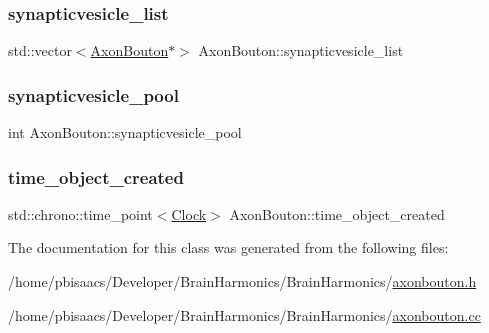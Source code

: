 \subsubsection{\texorpdfstring{synapticvesicle\+\_\+list}{synapticvesicle\_list}}
{\footnotesize\ttfamily std\+::vector$<$\mbox{\hyperlink{classAxonBouton}{Axon\+Bouton}}$\ast$$>$ Axon\+Bouton\+::synapticvesicle\+\_\+list\hspace{0.3cm}{\ttfamily [protected]}}

\mbox{\label{classAxonBouton_a6af09fee2eb7a38e8591770bc9c070ac}} 
\subsubsection{\texorpdfstring{synapticvesicle\+\_\+pool}{synapticvesicle\_pool}}
{\footnotesize\ttfamily int Axon\+Bouton\+::synapticvesicle\+\_\+pool\hspace{0.3cm}{\ttfamily [private]}}

\mbox{\label{classAxonBouton_a26b17307437394ff14bfb5ef8dfad1e5}} 
\subsubsection{\texorpdfstring{time\+\_\+object\+\_\+created}{time\_object\_created}}
{\footnotesize\ttfamily std\+::chrono\+::time\+\_\+point$<$\mbox{\hyperlink{universe_8h_a0ef8d951d1ca5ab3cfaf7ab4c7a6fd80}{Clock}}$>$ Axon\+Bouton\+::time\+\_\+object\+\_\+created\hspace{0.3cm}{\ttfamily [private]}}



The documentation for this class was generated from the following files\+:\begin{DoxyCompactItemize}
\item 
/home/pbisaacs/\+Developer/\+Brain\+Harmonics/\+Brain\+Harmonics/\mbox{\hyperlink{axonbouton_8h}{axonbouton.\+h}}\item 
/home/pbisaacs/\+Developer/\+Brain\+Harmonics/\+Brain\+Harmonics/\mbox{\hyperlink{axonbouton_8cc}{axonbouton.\+cc}}\end{DoxyCompactItemize}
